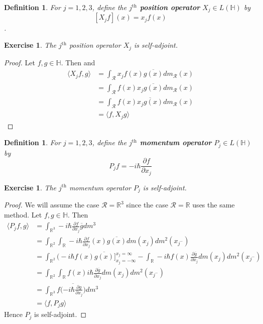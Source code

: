 \documentclass[12pt]{amsart}
\newtheorem{defn}[thm]{Definition}
\newtheorem{ex}[thm]{Exercise}
\renewcommand{\r}{\rangle}
\renewcommand{\l}{\langle}
\renewcommand{\H}{\mathbb{H}}
\newcommand{\R}{\mathbb{R}}
\renewcommand{\MR}{\mathcal{R}}
\begin{document}
\begin{defn}
For $j =1,2,3$, define the \textbf{$j^{\text{th}}$ position operator} $X_j \in L(\H)$ by $$[X_jf](x) = x_jf(x)$$.
\end{defn}

\begin{ex}
The $j^{\text{th}}$ position operator $X_j$ is self-adjoint.
\end{ex}

\begin{proof}
Let $f, g \in \H$. Then  and 
\begin{align*}
\l X_jf, g\r 
&= \int_\MR x_jf(x)\overline{g(x)}dm_{\MR}(x)\\
&= \int_\MR f(x)x_j\overline{g(x)}dm_{\MR}(x)\\
&= \int_\MR f(x)\overline{x_jg(x)}dm_{\MR}(x)\\
&=\l f, X_jg\r 
\end{align*}
\end{proof}

\begin{defn}
For $j =1,2,3$, define the \textbf{$j^{\text{th}}$ momentum operator} $P_j \in L(\H)$ by $$P_jf = -i \hbar \frac{\partial f}{\partial x_j}$$
\end{defn}
\newpage

\begin{ex}
The $j^{\text{th}}$ momentum operator $P_j$ is self-adjoint.
\end{ex}

\begin{proof}
We will assume the case $\MR = \R^3$ since the case $\MR=\R$ uses the same method. Let $f,g \in \H$. Then 
\begin{align*}
\l P_jf, g\r
&= \int_{\R^3} -i\hbar \frac{\partial f}{\partial x_j}\overline{g} dm^3\\
&= \int_{\R^2} \int_{\R} -i\hbar \frac{\partial f}{\partial x_j}(x)\overline{g(x)} dm(x_j)dm^2(x_{j^-})\\
&= \int_{\R^2} \bigg(-i\hbar f(x) \overline{g(x)} \bigg]^{x_j=\infty}_{x_j= -\infty} - \int_{\R} -i \hbar f(x) \frac{\partial \overline{g}}{\partial x_j} dm(x_j)dm^2(x_{j^-})\\
&= \int_{\R^2} \int_{\R}  f(x) i \hbar \frac{\partial \overline{g}}{\partial x_j} dm(x_j)dm^2(x_{j^-})\\
&= \int_{\R^3} f \bigg(\overline{-i \hbar\frac{\partial g}{\partial x_j} }\bigg)dm^3 \\
&= \l f, P_j g\r 
\end{align*}
Hence $P_j$ is self-adjoint.

\end{proof}
\end{document}
